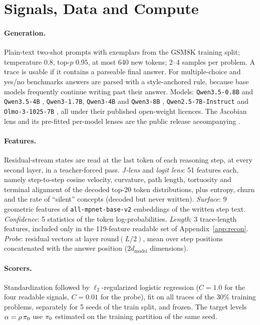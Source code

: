 \section{Signals, Data and Compute}
\label{app:signals}

\paragraph{Generation.} Plain-text two-shot prompts with exemplars from the GSM8K training split; temperature $0.8$, top-$p$ $0.95$, at most 640 new tokens; 2--4 samples per problem. A trace is usable if it contains a parseable final answer. For multiple-choice and yes/no benchmarks answers are parsed with a style-anchored rule, because base models frequently continue writing past their answer. Models: \texttt{Qwen3.5-0.8B} and \texttt{Qwen3.5-4B} \citep{qwen2026qwen35}, \texttt{Qwen3-1.7B}, \texttt{Qwen3-4B} and \texttt{Qwen3-8B} \citep{yang2025qwen3}, \texttt{Qwen2.5-7B-Instruct} \citep{qwen2024qwen25} and \texttt{Olmo-3-1025-7B} \citep{olmo2025olmo3}, all under their published open-weight licences. The Jacobian lens and its pre-fitted per-model lenses are the public release accompanying \citet{gurnee2026workspace}.

\paragraph{Features.} Residual-stream states are read at the last token of each reasoning step, at every second layer, in a teacher-forced pass. \emph{J-lens} and \emph{logit lens}: 51 features each, namely step-to-step cosine velocity, curvature, path length, tortuosity and terminal alignment of the decoded top-20 token distributions, plus entropy, churn and the rate of ``silent'' concepts (decoded but never written). \emph{Surface}: 9 geometric features of \texttt{all-mpnet-base-v2} embeddings of the written step text. \emph{Confidence}: 5 statistics of the token log-probabilities. \emph{Length}: 3 trace-length features, included only in the 119-feature readable set of Appendix~\ref{app:recon}. \emph{Probe}: residual vectors at layer $\mathrm{round}(L/2)$, mean over step positions concatenated with the answer position ($2d_{\mathrm{model}}$ dimensions).

\paragraph{Scorers.} Standardization followed by $\ell_2$-regularized logistic regression ($C=1.0$ for the four readable signals, $C=0.01$ for the probe), fit on all traces of the 30\% training problems, separately for 5 seeds of the train split, and frozen. The target levels $\alpha=\rho\,\pi_0$ use $\pi_0$ estimated on the training partition of the same seed.

